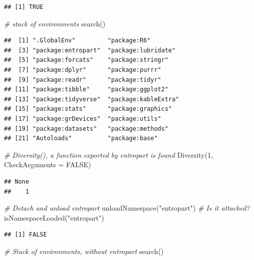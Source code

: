 \documentclass[
  12pt,
  american,
  a4paper,
  extrafontsizes,onecolumn,openright
  ]{memoir}
\newenvironment{Shaded}{\begin{snugshade}}{\end{snugshade}}
\newcommand{\AttributeTok}[1]{\textcolor[rgb]{0.77,0.63,0.00}{#1}}
\newcommand{\CommentTok}[1]{\textcolor[rgb]{0.56,0.35,0.01}{\textit{#1}}}
\newcommand{\ConstantTok}[1]{\textcolor[rgb]{0.00,0.00,0.00}{#1}}
\newcommand{\DecValTok}[1]{\textcolor[rgb]{0.00,0.00,0.81}{#1}}
\newcommand{\FunctionTok}[1]{\textcolor[rgb]{0.00,0.00,0.00}{#1}}
\newcommand{\NormalTok}[1]{#1}
\newcommand{\StringTok}[1]{\textcolor[rgb]{0.31,0.60,0.02}{#1}}
\begin{document}
\begin{verbatim}
## [1] TRUE
\end{verbatim}

\begin{Shaded}
\begin{Highlighting}[]
\CommentTok{\# stack of environments}
\FunctionTok{search}\NormalTok{()}
\end{Highlighting}
\end{Shaded}

\begin{verbatim}
##  [1] ".GlobalEnv"         "package:R6"        
##  [3] "package:entropart"  "package:lubridate" 
##  [5] "package:forcats"    "package:stringr"   
##  [7] "package:dplyr"      "package:purrr"     
##  [9] "package:readr"      "package:tidyr"     
## [11] "package:tibble"     "package:ggplot2"   
## [13] "package:tidyverse"  "package:kableExtra"
## [15] "package:stats"      "package:graphics"  
## [17] "package:grDevices"  "package:utils"     
## [19] "package:datasets"   "package:methods"   
## [21] "Autoloads"          "package:base"
\end{verbatim}

\begin{Shaded}
\begin{Highlighting}[]
\CommentTok{\# Diversity(), a function exported by entropart is found}
\FunctionTok{Diversity}\NormalTok{(}\DecValTok{1}\NormalTok{, }\AttributeTok{CheckArguments =} \ConstantTok{FALSE}\NormalTok{)}
\end{Highlighting}
\end{Shaded}

\begin{verbatim}
## None 
##    1
\end{verbatim}

\begin{Shaded}
\begin{Highlighting}[]
\CommentTok{\# Detach and unload entropart}
\FunctionTok{unloadNamespace}\NormalTok{(}\StringTok{"entropart"}\NormalTok{)}
\CommentTok{\# Is it attached?}
\FunctionTok{isNamespaceLoaded}\NormalTok{(}\StringTok{"entropart"}\NormalTok{)}
\end{Highlighting}
\end{Shaded}

\begin{verbatim}
## [1] FALSE
\end{verbatim}

\begin{Shaded}
\begin{Highlighting}[]
\CommentTok{\# Stack of environments, without entropart}
\FunctionTok{search}\NormalTok{()}
\end{Highlighting}
\end{Shaded}
\end{document}

